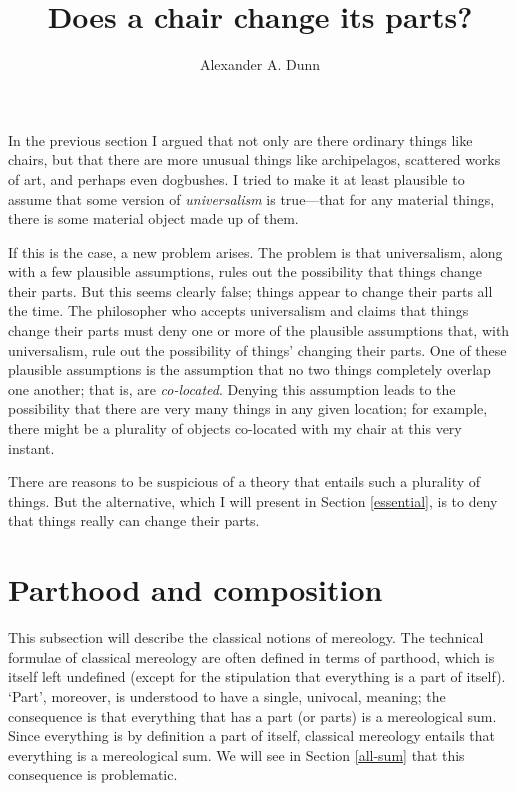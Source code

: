 \documentclass[11pt]{article}
\title{Does a chair change its parts?}
\author{Alexander A. Dunn}
\begin{document}
\ifstandalone
\maketitle
\begin{spacing}{1.5}
\fi

\label{parts}

In the previous section I argued that not only are there ordinary
things like chairs, but that there are more unusual things like
archipelagos, scattered works of art, and perhaps even dogbushes.  I
tried to make it at least plausible to assume that some version of
{\em universalism} is true---that for any material things, there is
some material object made up of them.

If this is the case, a new problem arises.  The problem is that
universalism, along with a few plausible assumptions, rules out the
possibility that things change their parts.  But this seems clearly
false; things appear to change their parts all the time.  The
philosopher who accepts universalism and claims that things change
their parts must deny one or more of the plausible assumptions that,
with universalism, rule out the possibility of things' changing their
parts.  One of these plausible assumptions is the assumption that no
two things completely overlap one another; that is, are {\em
  co-located}.  Denying this assumption leads to the possibility that
there are very many things in any given location; for example, there
might be a plurality of objects co-located with my chair at this very
instant.

There are reasons to be suspicious of a theory that entails such a
plurality of things.  But the alternative, which I will present in
Section \ref{essential}, is to deny that things really can change
their parts.

\section{Parthood and composition}
\label{part-comp}
This subsection will describe the classical notions of mereology.  The
technical formulae of classical mereology are often defined in terms
of parthood, which is itself left undefined (except for the
stipulation that everything is a part of itself).  `Part', moreover,
is understood to have a single, univocal, meaning; the consequence is
that everything that has a part (or parts) is a mereological sum.
Since everything is by definition a part of itself, classical
mereology entails that everything is a mereological sum.  We will see
in Section \ref{all-sum} that this consequence is problematic.


\end{spacing}
\end{document}
